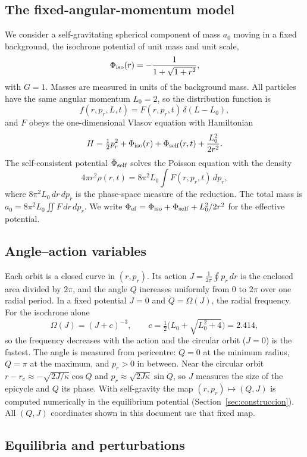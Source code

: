 \documentclass[11pt,a4paper]{article}
\begin{document}
\subsection{The fixed-angular-momentum model}
\label{sec:modelo}

We consider a self-gravitating spherical component of mass $a_0$ moving in a fixed
background, the isochrone potential of unit mass and unit scale,
\[
  \Phi_{\rm iso}(r)=-\frac{1}{1+\sqrt{1+r^2}},
\]
with $G=1$. Masses are measured in units of the background mass. All particles have
the same angular momentum $L_0=2$, so the distribution function is
\[
  f(r,p_r,L,t)=F(r,p_r,t)\,\delta(L-L_0),
\]
and $F$ obeys the one-dimensional Vlasov equation with Hamiltonian
\[
  H=\tfrac12p_r^2+\Phi_{\rm iso}(r)+\Phi_{\rm self}(r,t)+\frac{L_0^2}{2r^2}.
\]
The self-consistent potential $\Phi_{\rm self}$ solves the Poisson equation with the
density
\[
  4\pi r^2\rho(r,t)=8\pi^2L_0\int F(r,p_r,t)\,dp_r ,
\]
where $8\pi^2L_0\,dr\,dp_r$ is the phase-space measure of the reduction. The total mass
is $a_0=8\pi^2L_0\iint F\,dr\,dp_r$. We write $\Phi_{\rm ef}=\Phi_{\rm iso}+\Phi_{\rm
self}+L_0^2/2r^2$ for the effective potential.

\subsection{Angle--action variables}
\label{sec:aa}

Each orbit is a closed curve in $(r,p_r)$. Its action $J=\frac1{2\pi}\oint p_r\,dr$ is
the enclosed area divided by $2\pi$, and the angle $Q$ increases uniformly from $0$ to
$2\pi$ over one radial period. In a fixed potential $\dot J=0$ and $\dot Q=\Omega(J)$,
the radial frequency. For the isochrone alone
\[
  \Omega(J)=(J+c)^{-3},\qquad c=\tfrac12\big(L_0+\sqrt{L_0^2+4}\big)=2.414,
\]
so the frequency decreases with the action and the circular orbit ($J=0$) is the
fastest. The angle is measured from pericentre: $Q=0$ at the minimum radius, $Q=\pi$
at the maximum, and $p_r>0$ in between. Near the circular orbit
$r-r_c\approx-\sqrt{2J/\kappa}\cos Q$ and $p_r\approx\sqrt{2J\kappa}\sin Q$, so $J$
measures the size of the epicycle and $Q$ its phase. With self-gravity the map
$(r,p_r)\mapsto(Q,J)$ is computed numerically in the equilibrium potential
(Section~\ref{sec:construccion}). All $(Q,J)$ coordinates shown in this document use
that fixed map.

\subsection{Equilibria and perturbations}
\label{sec:equilibrio}
\label{sec:dato}
\end{document}
